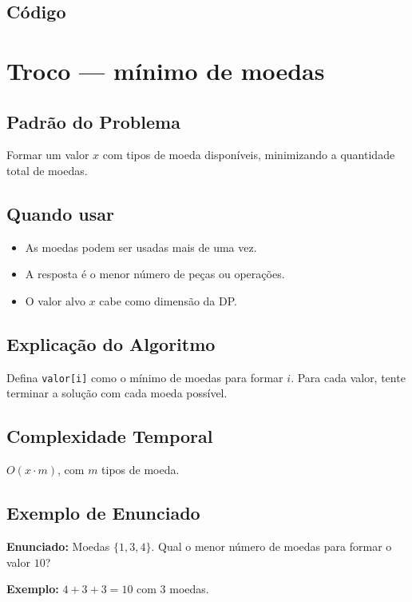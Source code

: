 \subsection{Código}

\section{Troco --- mínimo de moedas}

\subsection{Padrão do Problema}
Formar um valor $x$ com tipos de moeda disponíveis, minimizando a quantidade total de moedas.

\subsection{Quando usar}
\begin{itemize}[nosep]
  \item As moedas podem ser usadas mais de uma vez.
  \item A resposta é o menor número de peças ou operações.
  \item O valor alvo $x$ cabe como dimensão da DP.
\end{itemize}

\subsection{Explicação do Algoritmo}
Defina \texttt{valor[i]} como o mínimo de moedas para formar $i$. Para cada valor, tente terminar a solução com cada moeda possível.

\subsection{Complexidade Temporal}
$O(x \cdot m)$, com $m$ tipos de moeda.

\subsection{Exemplo de Enunciado}
\begin{exemplodiabox}
\textbf{Enunciado:} Moedas $\{1, 3, 4\}$. Qual o menor número de moedas para formar o valor $10$?

\textbf{Exemplo:} $4 + 3 + 3 = 10$ com $3$ moedas.
\end{exemplodiabox}

